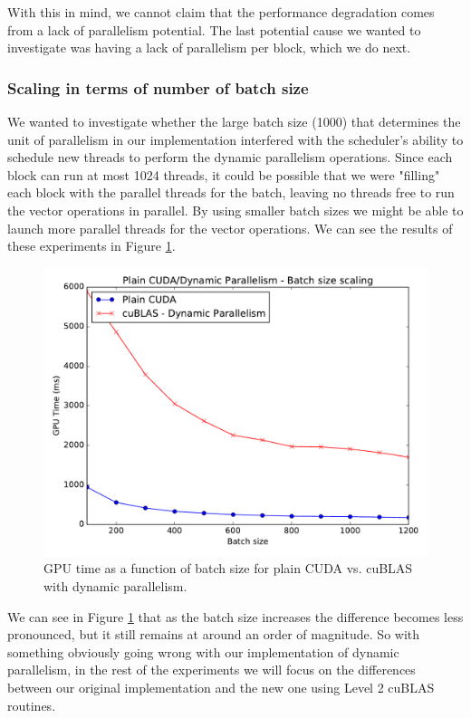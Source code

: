 \documentclass[11pt,a4paper]{article}
\begin{document}
With this in mind, we cannot claim that the performance degradation comes from a lack of parallelism
potential. The last potential cause we wanted to investigate was having a lack of parallelism
per block, which we do next.

\pagebreak

\subsubsection*{Scaling in terms of number of batch size}

We wanted to investigate whether the large batch size (1000) that determines the unit
of parallelism in our implementation interfered with the scheduler's ability to schedule
new threads to perform the dynamic parallelism operations. Since each block can run at most 1024 threads,
it could be possible that we were "filling" each block with the parallel threads for the batch, leaving
no threads free to run the vector operations in parallel. By using smaller batch sizes we might be able
to launch more parallel threads for the vector operations. We can see the results of these experiments
in Figure \ref{fig:plain-dpar-batch-size}.

\begin{figure}[H]
	\centering
	\includegraphics[width=0.8\linewidth]{gpu_plain_vs_Lvl1cuBLAS-100b-1200b.pdf}
	\caption{GPU time as a function of batch size for plain CUDA vs. cuBLAS with dynamic parallelism.}
	\label{fig:plain-dpar-batch-size}
\end{figure}

We can see in Figure \ref{fig:plain-dpar-batch-size} that as the batch size increases the difference becomes less pronounced,
but it still remains at around an order of magnitude. So with something obviously going wrong with
our implementation of dynamic parallelism, in the rest of the experiments we will focus on the differences
between our original implementation and the new one using Level 2 cuBLAS routines.
\end{document}
